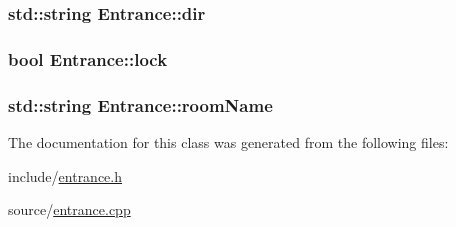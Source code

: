 \subsubsection[{\texorpdfstring{dir}{dir}}]{\setlength{\rightskip}{0pt plus 5cm}std\+::string Entrance\+::dir\hspace{0.3cm}{\ttfamily [private]}}\hypertarget{class_entrance_ad9ee71c233e33d198c7a6c4d1ec90b46}{}\label{class_entrance_ad9ee71c233e33d198c7a6c4d1ec90b46}
\subsubsection[{\texorpdfstring{lock}{lock}}]{\setlength{\rightskip}{0pt plus 5cm}bool Entrance\+::lock\hspace{0.3cm}{\ttfamily [private]}}\hypertarget{class_entrance_a16540d02b9f34c068cda79c86dc3df5e}{}\label{class_entrance_a16540d02b9f34c068cda79c86dc3df5e}
\subsubsection[{\texorpdfstring{room\+Name}{roomName}}]{\setlength{\rightskip}{0pt plus 5cm}std\+::string Entrance\+::room\+Name\hspace{0.3cm}{\ttfamily [private]}}\hypertarget{class_entrance_a228a17052cfc8eb772255bee5e9f56ae}{}\label{class_entrance_a228a17052cfc8eb772255bee5e9f56ae}


The documentation for this class was generated from the following files\+:\begin{DoxyCompactItemize}
\item 
include/\hyperlink{entrance_8h}{entrance.\+h}\item 
source/\hyperlink{entrance_8cpp}{entrance.\+cpp}\end{DoxyCompactItemize}
